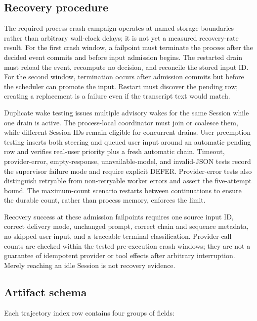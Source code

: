 \subsection{Recovery procedure}

The required process-crash campaign operates at named storage boundaries rather than arbitrary wall-clock delays; it is not yet a measured recovery-rate result. For the first crash window, a failpoint must terminate the process after the decided event commits and before input admission begins. The restarted drain must reload the event, recompute no decision, and reconcile the stored input ID. For the second window, termination occurs after admission commits but before the scheduler can promote the input. Restart must discover the pending row; creating a replacement is a failure even if the transcript text would match.

Duplicate wake testing issues multiple advisory wakes for the same Session while one drain is active. The process-local coordinator must join or coalesce them, while different Session IDs remain eligible for concurrent drains. User-preemption testing inserts both steering and queued user input around an automatic pending row and verifies real-user priority plus a fresh automatic chain. Timeout, provider-error, empty-response, unavailable-model, and invalid-JSON tests record the supervisor failure mode and require explicit DEFER. Provider-error tests also distinguish retryable from non-retryable worker errors and assert the five-attempt bound. The maximum-count scenario restarts between continuations to ensure the durable count, rather than process memory, enforces the limit.

Recovery success at these admission failpoints requires one source input ID, correct delivery mode, unchanged prompt, correct chain and sequence metadata, no skipped user input, and a traceable terminal classification. Provider-call counts are checked within the tested pre-execution crash windows; they are not a guarantee of idempotent provider or tool effects after arbitrary interruption. Merely reaching an idle Session is not recovery evidence.

\subsection{Artifact schema}

Each trajectory index row contains four groups of fields:

